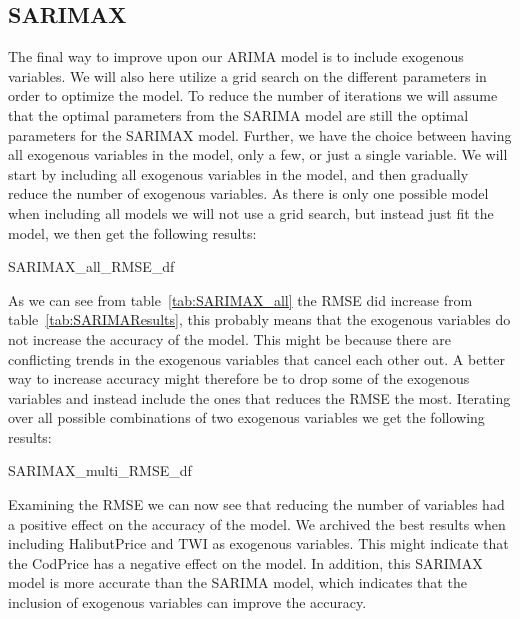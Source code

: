 \subsection{SARIMAX}\label{sec:sarimax}
The final way to improve upon our ARIMA model is to include exogenous variables. We will also here utilize a grid search on the different parameters in order to optimize the model. To reduce the number of iterations we will assume that the optimal parameters from the SARIMA model are still the optimal parameters for the SARIMAX model. Further, we have the choice between having all exogenous variables in the model, only a few, or just a single variable. We will start by including all exogenous variables in the model, and then gradually reduce the number of exogenous variables. As there is only one possible model when including all models we will not use a grid search, but instead just fit the model, we then get the following results:
\begin{table}[H]
    \begin{center}
        {SARIMAX_all_RMSE_df}
        \caption{Result from SARIMAX model with all exogenous variables.}\label{tab:SARIMAX_all}
    \end{center}
\end{table}
As we can see from table~\ref{tab:SARIMAX_all} the RMSE did increase from table~\ref{tab:SARIMAResults}, this probably means that the exogenous variables do not increase the accuracy of the model. This might be because there are conflicting trends in the exogenous variables that cancel each other out. A better way to increase accuracy might therefore be to drop some of the exogenous variables and instead include the ones that reduces the RMSE the most. Iterating over all possible combinations of two exogenous variables we get the following results:
\begin{table}[H]
    \begin{center}
        {SARIMAX_multi_RMSE_df}
        \caption{Result from SARIMAX model with two exogenous variables.}\label{tab:SARIMAX_multi}
    \end{center}
\end{table}
Examining the RMSE we can now see that reducing the number of variables had a positive effect on the accuracy of the model. We archived the best results when including HalibutPrice and TWI as exogenous variables. This might indicate that the CodPrice has a negative effect on the model. In addition, this SARIMAX model is more accurate than the SARIMA model, which indicates that the inclusion of exogenous variables can improve the accuracy. 

